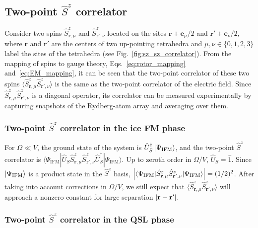 \documentclass[twocolumn,superscriptaddress,amsmath,amssymb,aps,prx,nofootinbib]{revtex4-2}
\begin{document}
\subsection{Two-point $\hat{S}^z$ correlator} \label{sec:sz_sz_correlator}

Consider  two spins $\hat{S}^z_{\mathbf{r},\mu}$ and $\hat{S}^z_{\mathbf{r}',\nu}$ located on the sites $\mathbf{r} + \mathbf{e}_\mu/2$ and $\mathbf{r}' + \mathbf{e}_\nu/2$, where $\mathbf{r}$ and $\mathbf{r}'$ are the centers of two up-pointing tetrahedra and $\mu, \nu \in \{ 0,1,2,3 \}$ label the sites of the tetrahedra (see Fig.~\ref{fig:sz_sz_correlator}). From the mapping of spins to gauge theory, Eqs.~\eqref{eq:rotor_mapping} and~\eqref{eq:EM_mapping}, it can be seen that the two-point  correlator of these two spins $\langle \hat{S}^z_{\mathbf{r},\mu} \hat{S}^z_{\mathbf{r}',\nu}\rangle $ is the same as the two-point correlator of the electric field. Since $\hat{S}^z_{\mathbf{r},\mu} \hat{S}^z_{\mathbf{r'},\nu} $ is a diagonal operator, its correlator can be measured experimentally by capturing snapshots of the Rydberg-atom array and averaging over them.

\subsubsection{Two-point $\hat{S}^z$ correlator in the ice FM phase}
\label{sec:sz_sz_corr_ice_fm}


For $\Omega \ll V$, the ground state of the system is $\hat{U}_S^\dagger \ket{\Psi_\text{IFM}}$, and the two-point $\hat{S}^z$ correlator is $\langle \Psi_\text{IFM} | \hat{U}_S \hat{S}^z_{\mathbf{r},\mu} \hat{S}^z_{\mathbf{r}',\nu} \hat{U}_S^\dagger | \Psi_\text{IFM} \rangle $. 
Up to zeroth order in $\Omega/V$, $\hat{U}_S =\hat{1}$. 
Since $\ket{\Psi_\text{IFM}}$ is a  product state in the $\hat{S}^z$ basis, $\abs{\langle \Psi_\text{IFM} | \hat{S}^z_{\mathbf{r},\mu} \hat{S}^z_{\mathbf{r}',\nu} | \Psi_\text{IFM} \rangle } = (1/2)^2$. After taking into account corrections in $\Omega/V$, we still expect that $\langle \hat{S}^z_{\mathbf{r},\mu} \hat{S}^z_{\mathbf{r}',\nu}\rangle $ will approach a nonzero constant for large separation $\abs{ \mathbf{r} - \mathbf{r}'} $. 

\subsubsection{Two-point $\hat{S}^z$ correlator in the QSL phase}
\label{sec:sz_sz_corr_qsl}
\end{document}
